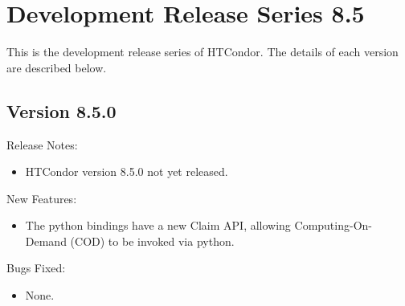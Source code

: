
\section{\label{sec:History-8-5}Development Release Series 8.5}

This is the development release series of HTCondor.
The details of each version are described below.


\subsection*{\label{sec:New-8-5-0}Version 8.5.0}

\noindent Release Notes:

\begin{itemize}

\item HTCondor version 8.5.0 not yet released.

\end{itemize}


\noindent New Features:

\begin{itemize}

\item The python bindings have a new Claim API, allowing Computing-On-Demand (COD) to be
invoked via python.

\end{itemize}

\noindent Bugs Fixed:

\begin{itemize}

\item None.

\end{itemize}
